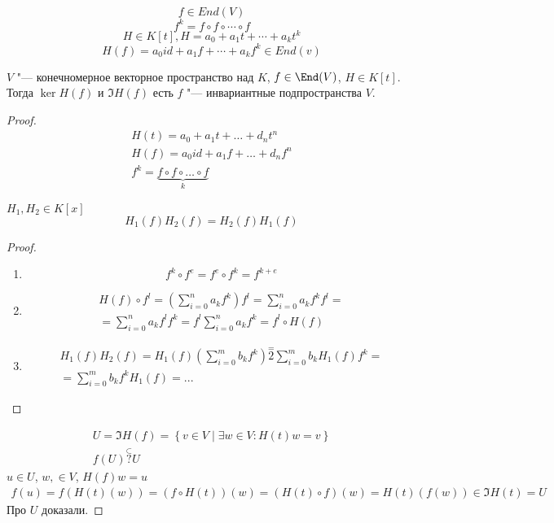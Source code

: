 $$f \in End(V)$$
$$f^{k} = f\circ f \circ \cdots \circ f$$
$$H \in K[t], H = a_0 + a_1t + \cdots + a_kt^{k}$$
$$H(f) = a_0 id + a_1f + \cdots + a_kf^k \in End(v)$$


\begin{theorem}
	$V$ "--- конечномерное векторное пространство над $K$, $f \in \End(V)$, $H \in K[t]$.
	Тогда $\ker H(f)$ и $\Im H(f)$ есть $f$ "--- инвариантные подпространства $V$.
\end{theorem}

\begin{proof}
	\begin{gather*}
		H(t) = a_0 + a_1 t + \dots + d_n t^n \\
		H(f) = a_0 id + a_1 f + \dots + d_n f^n \\
		f^k = \underbrace{f \circ f \circ \dots \circ f}_{k}
	\end{gather*}
	\begin{lemma}
		$H_1, H_2 \in K[x]$
		\[ H_1(f)H_2(f) = H_2(f)H_1(f) \]
	\end{lemma}
	\begin{proof}
		\begin{enumerate}
		\item
			\[ f^k \circ f^e = f^e \circ f^k = f^{k+e} \]

		\item
			\begin{gather*}
				H(f) \circ f^l = \left( \sum_{i=0}^n a_k f^k \right) f^l = \sum_{i=0}^n a_k f^k f^l = \\
				= \sum_{i=0}^n a_k f^l f^k = f^l \sum_{i=0}^n a_k f^k = f^l \circ H(f)
			\end{gather*}

		\item
			\begin{gather*}
				H_1(f) H_2(f) = H_1(f) \left( \sum_{i=0}^m b_k f^k \right) \stackrel{=}{2} \sum_{i=0}^m b_k H_1(f) f^k = \\
				= \sum_{i=0}^m b_k f^k H_1(f) = ...
			\end{gather*}
		\end{enumerate}
	\end{proof}
	\begin{gather*}
		U = \Im H(f) = \left\{ v \in V \mid \exists w \in V\colon H(t)w = v\right\} \\
		f(U) \stackrel{\subset}{?} U
	\end{gather*}
	$u \in U$, $w, \in V$, $H(f)w = u$
	\begin{gather*}
		f(u) = f(H(t)(w)) = (f \circ H(t))(w) = (H(t) \circ f)(w) = H(t) (f(w)) \in \Im H(t) = U
	\end{gather*}
	Про $U$ доказали.


\end{proof}
